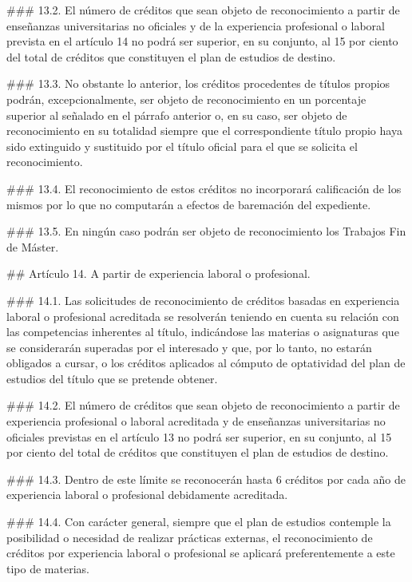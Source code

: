 \documentclass{article}
\begin{document}
\begin{itemize}
\begin{itemize}
\begin{scriptsize}
                  \#\#\# 13.2.
                  El número de créditos que sean objeto de reconocimiento a partir de enseñanzas universitarias no oficiales y de la experiencia profesional o laboral prevista en el artículo 14 no podrá ser superior, en su conjunto, al 15 por ciento del total de créditos que constituyen el plan de estudios de destino.

                  \#\#\# 13.3.
                  No obstante lo anterior, los créditos procedentes de títulos propios podrán, excepcionalmente, ser objeto de reconocimiento en un porcentaje superior al señalado en el párrafo anterior o, en su caso, ser objeto de reconocimiento en su totalidad siempre que el correspondiente título propio haya sido extinguido y sustituido por el título oficial para el que se solicita el reconocimiento.

                  \#\#\# 13.4.
                  El reconocimiento de estos créditos no incorporará calificación de los mismos por lo que no computarán a efectos de baremación del expediente.

                  \#\#\# 13.5.
                  En ningún caso podrán ser objeto de reconocimiento los Trabajos Fin de Máster.

                  \#\# Artículo 14. A partir de experiencia laboral o profesional.

                  \#\#\# 14.1.
                  Las solicitudes de reconocimiento de créditos basadas en experiencia laboral o profesional acreditada se resolverán teniendo en cuenta su relación con las competencias inherentes al título, indicándose las materias o asignaturas que se considerarán superadas por el interesado y que, por lo tanto, no estarán obligados a cursar, o los créditos aplicados al cómputo de optatividad del plan de estudios del título que se pretende obtener.

                  \#\#\# 14.2.
                  El número de créditos que sean objeto de reconocimiento a partir de experiencia profesional o laboral acreditada y de enseñanzas universitarias no oficiales previstas en el artículo 13 no podrá ser superior, en su conjunto, al 15 por ciento del total de créditos que constituyen el plan de estudios de destino.

                  \#\#\# 14.3.
                  Dentro de este límite se reconocerán hasta 6 créditos por cada año de experiencia laboral o profesional debidamente acreditada.

                  \#\#\# 14.4.
                  Con carácter general, siempre que el plan de estudios contemple la posibilidad o necesidad de realizar prácticas externas, el reconocimiento de créditos por experiencia laboral o profesional se aplicará preferentemente a este tipo de materias.


\end{scriptsize}
\end{itemize}
\end{itemize}
\end{document}
